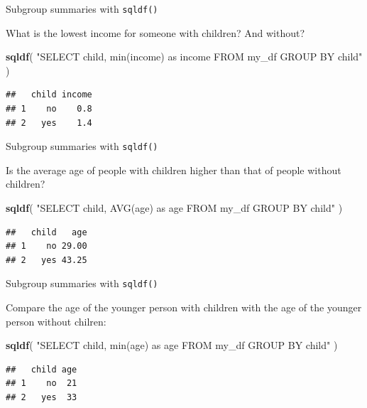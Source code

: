 \documentclass[ignorenonframetext,]{beamer}
\newenvironment{Shaded}{\begin{snugshade}}{\end{snugshade}}
\newcommand{\KeywordTok}[1]{\textcolor[rgb]{0.13,0.29,0.53}{\textbf{#1}}}
\newcommand{\NormalTok}[1]{#1}
\newcommand{\StringTok}[1]{\textcolor[rgb]{0.31,0.60,0.02}{#1}}
\begin{document}
\begin{frame}[fragile]{Subgroup summaries with \texttt{sqldf()}}
\protect\hypertarget{subgroup-summaries-with-sqldf-2}{}

What is the lowest income for someone with children? And without?

\begin{Shaded}
\begin{Highlighting}[]
\KeywordTok{sqldf}\NormalTok{(}
  \StringTok{"SELECT child, min(income) as income }
\StringTok{  FROM my_df}
\StringTok{  GROUP BY child"}
\NormalTok{)}
\end{Highlighting}
\end{Shaded}

\begin{verbatim}
##   child income
## 1    no    0.8
## 2   yes    1.4
\end{verbatim}

\end{frame}

\begin{frame}[fragile]{Subgroup summaries with \texttt{sqldf()}}
\protect\hypertarget{subgroup-summaries-with-sqldf-3}{}

Is the average age of people with children higher than that of people
without children?

\begin{Shaded}
\begin{Highlighting}[]
\KeywordTok{sqldf}\NormalTok{(}
  \StringTok{"SELECT child, AVG(age) as age }
\StringTok{  FROM my_df}
\StringTok{  GROUP BY child"}
\NormalTok{)}
\end{Highlighting}
\end{Shaded}

\begin{verbatim}
##   child   age
## 1    no 29.00
## 2   yes 43.25
\end{verbatim}

\end{frame}

\begin{frame}[fragile]{Subgroup summaries with \texttt{sqldf()}}
\protect\hypertarget{subgroup-summaries-with-sqldf-4}{}

Compare the age of the younger person with children with the age of the
younger person without chilren:

\begin{Shaded}
\begin{Highlighting}[]
\KeywordTok{sqldf}\NormalTok{(}
  \StringTok{"SELECT child, min(age) as age }
\StringTok{  FROM my_df}
\StringTok{  GROUP BY child"}
\NormalTok{)}
\end{Highlighting}
\end{Shaded}

\begin{verbatim}
##   child age
## 1    no  21
## 2   yes  33
\end{verbatim}

\end{frame}
\end{document}
